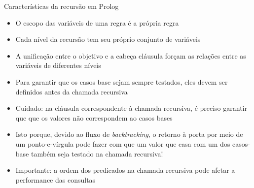 \begin{frame}[fragile]{Características da recursão em Prolog}

    \begin{itemize}
        \item O escopo das variáveis de uma regra é a própria regra

        \item Cada nível da recursão tem seu próprio conjunto de variáveis

        \item A unificação entre o objetivo e a cabeça cláusula forçam as relações entre as 
            variáveis de diferentes níveis

        \item Para garantir que os casos base sejam sempre testados, eles devem ser definidos 
            antes da chamada recursiva

        \item Cuidado: na cláusula correspondente à chamada recursiva, é preciso garantir que
            que os valores não correspondem ao casos bases

        \item Isto porque, devido ao fluxo de \textit{backtracking}, o retorno à porta
             por meio de um ponto-e-vírgula pode fazer com que um valor
            que casa com um dos casos-base também seja testado na chamada recursiva!
            
        \item Importante: a ordem dos predicados na chamada recursiva pode afetar a 
            performance das consultas

    \end{itemize}

\end{frame}
